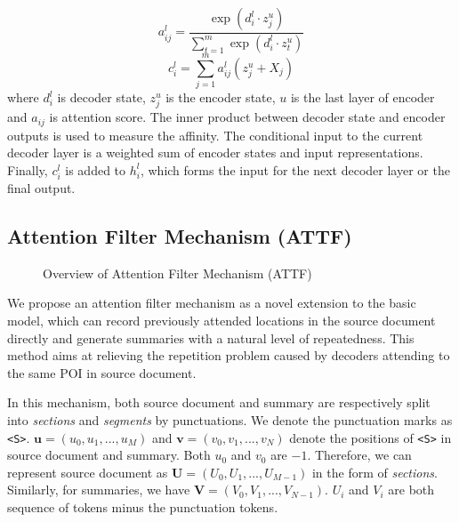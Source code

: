 \begin{equation}\label{eq:a}
    a _ { i j } ^ { l } = \frac { \exp \left( d _ { i } ^ { l } \cdot z _ { j } ^ { u } \right) } { \sum _ { t = 1 } ^ { m } \exp \left( d _ { i } ^ { l } \cdot z _ { t } ^ { u } \right) }
\end{equation}
\begin{equation}\label{eq:c}
    c _ { i } ^ { l } = \sum _ { j = 1 } ^ { m } a _ { i j } ^ { l } \left( z _ { j } ^ { u } + X_j \right)
\end{equation}
where $d_{i}^{l}$ is decoder state, $z_{j}^{u}$ is the encoder state, 
$u$ is the last layer of encoder
and $a_{ij}$ is attention score.
The inner product between decoder state and encoder outputs is used 
to measure the affinity. 
The conditional input to the current 
decoder layer is a weighted sum of encoder states and input representations.
Finally, $c _ { i } ^ { l }$ is added to $h_{i}^{l}$, which forms the input for the next decoder layer or the final output.

\subsection{Attention Filter Mechanism (ATTF)}
\label{sec:attf}

\begin{figure}[th]
	\centering
	\caption{Overview of Attention Filter Mechanism (ATTF)}
	\label{fig:model_main}
\end{figure}


\label{sec:attnf}
We propose an attention filter mechanism as a novel extension 
to the basic model,
which can record previously attended locations 
in the source document directly and generate summaries 
with a natural level of repeatedness. 
This method aims at relieving the repetition problem caused by 
decoders attending to the same POI in source document.

In this mechanism, both source document and summary are 
respectively split into 
\textit{sections} and \textit{segments} by punctuations. We
denote the punctuation marks as \verb#<S>#.
$\mathbf{u}=(u_{0},u_{1},...,u_{M})$ 
and $\mathbf{v}=(v_{0},v_{1},...,v_{N})$
denote the positions of \verb#<S># in source document and summary.
Both $u_{0}$ and $v_{0}$ are $-1$.
Therefore, we can represent source document as $\mathbf{U}=(U_{0},U_{1},...,U_{M-1})$ in the form of \textit{sections}. Similarly, for summaries, we have $\mathbf{V}=(V_{0},V_{1},...,V_{N-1})$. 
$U_i$ and $V_i$ are
both sequence of tokens minus the punctuation tokens.

